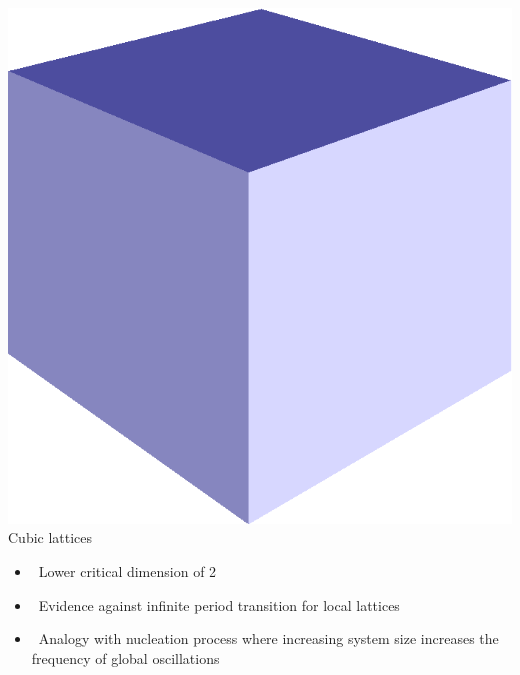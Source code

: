 \documentclass[serif,mathserif]{beamer}
\begin{document}
\begin{frame}{\includegraphics[height=0.06\textheight]{cube.eps}\hspace{0.25cm} Cubic lattices}
    \begin{itemize}
        \item \ \pause Lower critical dimension of 2
        \vspace{0.25cm}
        \item \ \pause Evidence against infinite period transition for local lattices
        \vspace{0.25cm}
        \item \ \pause Analogy with nucleation process where increasing system size increases the frequency of global oscillations
    \end{itemize}
\end{frame}
\end{document}
